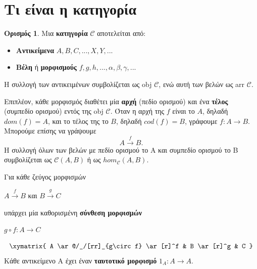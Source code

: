 \documentclass [a4paper,11pt] {book}
\theoremstyle{definition}
\theoremstyle{definition}
\newtheorem{definition}[theorem]{Ορισμός}
\begin{document}
\section{Τι είναι η κατηγορία}
\begin{definition}\label{category}
Μια \textbf{κατηγορία} $\mathcal{C}$ αποτελείται από:
\begin{itemize}
\item \textbf{Αντικείμενα} $ A,B,C,..., X,Y,... $
\item \textbf{Βέλη} ή \textbf{μορφισμούς} $ f,g,h,..., \alpha, \beta, \gamma,... $
\end{itemize}
Η συλλογή των αντικειμένων συμβολίζεται ως obj $\mathcal{C}$, ενώ αυτή των βελών ως arr $\mathcal{C}$.
\end{definition}
Επιπλέον, κάθε μορφισμός διαθέτει μία \textbf{αρχή} (πεδίο ορισμού) και ένα \textbf{τέλος} (συμπεδίο ορισμού) εντός της obj $\mathcal{C}$. Όταν η αρχή της $f$ είναι το $A$, δηλαδή $dom(f)=A$, και το τέλος της το $B$, δηλαδή $cod(f)=B$, γράφουμε $f:A \to B$. Μπορούμε επίσης να γράψουμε \begin{equation*}
A \xrightarrow{f} B.
\end{equation*}
Η συλλογή όλων των βελών με πεδίο ορισμού το Α και συμπεδίο ορισμού το Β συμβολίζεται ως $\mathcal{C}(A,B)$ ή ως $hom_{\mathcal{C}}(A,B)$.

Για κάθε ζεύγος μορφισμών
\begin{center}$A \xrightarrow{f} B$ και $ B \xrightarrow{g} C $\end{center}
υπάρχει μία καθορισμένη \textbf{σύνθεση μορφισμών}
\begin{center}$g \circ f: A \to C$\end{center}
\begin{displaymath}
	\xymatrix{
	A \ar@/_/[rr]_{g\circ f} \ar[r]^f & B \ar[r]^g & C
	}
\end{displaymath}
Κάθε αντικείμενο A έχει έναν \textbf{ταυτοτικό μορφισμό} $1_{A}:A\to A$.
\end{document}
